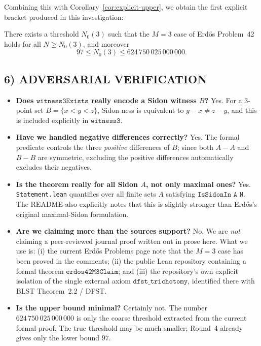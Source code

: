 Combining this with Corollary~\ref{cor:explicit-upper}, we obtain the first explicit bracket produced in this investigation:

\begin{theorem}[Threshold bracket for \(M=3\)]\label{thm:M3-bracket}
There exists a threshold \(N_0(3)\) such that the \(M=3\) case of Erd\H{o}s Problem~42 holds for all \(N\ge N_0(3)\), and moreover
\[
97 \le N_0(3)\le 624\,750\,025\,000\,000.
\]
\end{theorem}

\subsection{6) ADVERSARIAL VERIFICATION}
\begin{itemize}
  \item \textbf{Does \(\texttt{witness3Exists}\) really encode a Sidon witness \(B\)?}
  Yes.  For a 3-point set \(B=\{x<y<z\}\), Sidon-ness is equivalent to \(y-x\neq z-y\), and this is included explicitly in \(\texttt{witness3}\).

  \item \textbf{Have we handled negative differences correctly?}
  Yes.  The formal predicate controls the three \emph{positive} differences of \(B\); since both \(A-A\) and \(B-B\) are symmetric, excluding the positive differences automatically excludes their negatives.

  \item \textbf{Is the theorem really for all Sidon \(A\), not only maximal ones?}
  Yes.  \texttt{Statement.lean} quantifies over all finite sets \(A\) satisfying \(\texttt{IsSidonIn A N}\).  The README also explicitly notes that this is slightly stronger than Erd\H{o}s's original maximal-Sidon formulation.

  \item \textbf{Are we claiming more than the sources support?}
  No.  We are \emph{not} claiming a peer-reviewed journal proof written out in prose here.  What we use is:
  (i) the current Erd\H{o}s Problems page note that the \(M=3\) case has been proved in the comments;
  (ii) the public Lean repository containing a formal theorem \(\texttt{erdos42M3Claim}\);
  and (iii) the repository's own explicit isolation of the single external axiom \(\texttt{dfst\_trichotomy}\), identified there with BLST Theorem~2.2 / DFST.

  \item \textbf{Is the upper bound minimal?}
  Certainly not.  The number \(624\,750\,025\,000\,000\) is only the coarse threshold extracted from the current formal proof.  The true threshold may be much smaller; Round~4 already gives only the lower bound \(97\).
\end{itemize}

